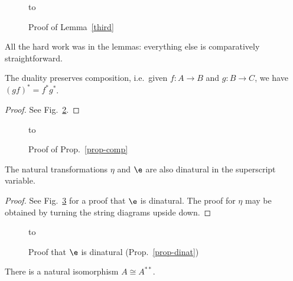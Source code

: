 \documentclass{robinthesisdraft}
\begin{document}
\begin{figure}
\hbox to 
\caption{Proof of Lemma~\ref{third}}\label{fig-third}
\end{figure}%
All the hard work was in the lemmas: everything else is comparatively straightforward.
\begin{propn}\label{prop-comp}
	The duality preserves composition, i.e.\ given $f:A\to B$ and $g: B\to C$,
	we have $(gf)^* = f^*g^*$.
\end{propn}
\begin{proof}
	See Fig.~\ref{fig-comp}.
\end{proof}
\begin{figure}
\hbox to 
\caption{Proof of Prop.~\ref{prop-comp}}\label{fig-comp}
\end{figure}%
\begin{propn}\label{prop-dinat}
	The natural transformations $\eta$ and $\e$ are also dinatural in
	the superscript variable.
\end{propn}
\begin{proof}
	See Fig.~\ref{fig-dinat} for a proof that $\e$ is dinatural.
	The proof for $\eta$ may be obtained by turning the string diagrams upside down. 
\end{proof}
\begin{figure}
\hbox to 
\caption{Proof that $\e$ is dinatural (Prop.~\ref{prop-dinat})}\label{fig-dinat}
\end{figure}%
\begin{propn}\label{prop-starstar}
	There is a natural isomorphism $A\cong A^{**}$.
\end{propn}
\end{document}

